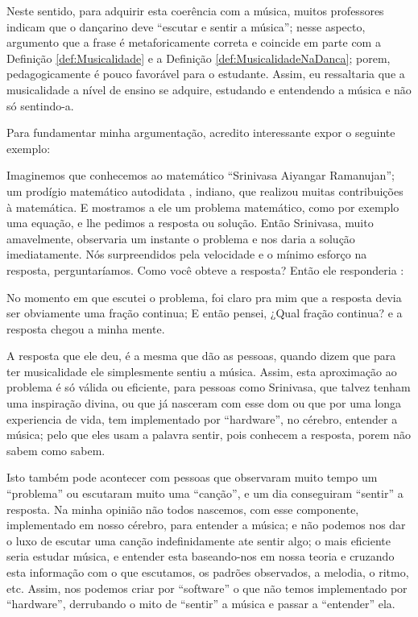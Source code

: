 Neste sentido, para adquirir esta coerência com a música, 
muitos professores indicam que o dançarino deve ``escutar e sentir a música'';
nesse aspecto, argumento que a frase é metaforicamente correta e coincide em parte com 
a Definição \ref{def:Musicalidade} e a Definição \ref{def:MusicalidadeNaDanca};
porem, pedagogicamente  é pouco favorável para o estudante.
Assim, eu ressaltaria que a musicalidade a nível de ensino se adquire,
estudando e entendendo a música e não só sentindo-a.
 
Para fundamentar minha argumentação, acredito interessante expor o seguinte exemplo: 
\begin{example}
Imaginemos que conhecemos ao matemático ``Srinivasa Aiyangar Ramanujan'';
um prodígio matemático autodidata \cite[pp. 1]{kanigel2016man}, indiano, que 
realizou muitas contribuições à matemática.
E mostramos a ele um problema matemático, como por exemplo uma equação,
e  lhe pedimos a resposta ou solução. 
Então Srinivasa, muito amavelmente, 
observaria um instante o problema e nos daria a solução imediatamente.
Nós surpreendidos pela velocidade e o mínimo esforço na resposta,
perguntaríamos. Como você obteve a resposta? Então ele responderia \cite[pp. 235]{kanigel2016man}: 
\begin{citando}
No momento em que escutei o problema, 
foi claro pra mim que a resposta devia ser obviamente uma fração continua; 
E então pensei, ¿Qual fração continua? e a resposta chegou a minha mente. 
\end{citando}
\end{example}

A resposta que ele deu, 
é a mesma  que dão as pessoas, quando  dizem que para ter musicalidade ele simplesmente sentiu a música. 
Assim, esta aproximação ao problema é só válida ou eficiente, para pessoas como Srinivasa, 
que talvez tenham uma inspiração divina, 
ou que já nasceram com esse dom ou que por uma longa experiencia de vida, 
tem implementado por ``hardware'', no cérebro, entender a música; 
pelo que eles usam a palavra sentir, 
pois conhecem a resposta, porem não sabem como sabem. 

Isto também pode acontecer com pessoas que observaram muito tempo um ``problema'' ou escutaram muito uma ``canção'', 
e um dia conseguiram ``sentir'' a resposta. Na minha opinião não todos nascemos, 
com esse componente, implementado em nosso cérebro, para entender  a música; 
e não podemos nos dar o luxo de escutar uma canção indefinidamente ate sentir algo; 
o mais eficiente seria estudar música, 
e entender esta baseando-nos em nossa teoria e cruzando esta informação com o que escutamos, 
os padrões observados, a melodia, o ritmo, etc. 
Assim, nos podemos criar por ``software'' o que não temos implementado por ``hardware'', 
derrubando o mito de ``sentir'' a música e passar a ``entender'' ela.


